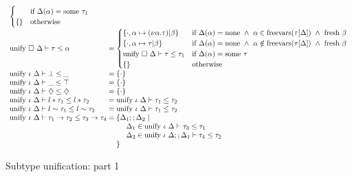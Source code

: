 \documentclass[sigplan,screen]{acmart}
\begin{document}
\begin{figure*}[h]
\[\begin{array}{l @{} l}
\begin{cases}
        &\text{if }
        \Delta(\alpha) = \text{some } \tau_1
        \\
        \{\}
        &\text{otherwise}
      \end{cases}
      \\
      \text{unify } \square\ \Delta \vdash \tau \leq \alpha	
      &{} =
      \begin{cases}  
        \{ \cdot,\alpha \mapsto (\nu\alpha.\tau)|\beta \}
        & \text{if } 
        \Delta(\alpha) = \text{none} \ \wedge\ 
        \alpha \in \text{freevars}(\tau[\Delta]) \ \wedge\ 
        \text{fresh } \beta
        \\
        \{ \cdot,\alpha \mapsto \tau|\beta \}
        & \text{if } 
        \Delta(\alpha) = \text{none} \ \wedge\ 
        \alpha \notin \text{freevars}(\tau[\Delta]) \ \wedge\ 
        \text{fresh } \beta
        \\
        \text{unify } \square\ \Delta \vdash \tau \leq \tau_1
        &\text{if }
        \Delta(\alpha) = \text{some } \tau
        \\
        \{\}
        &\text{otherwise}
      \end{cases}
      \\
      \text{unify } \iota\ \Delta \vdash \bot \leq \_	
      &{} = 
      \{\cdot\}
      \\
      \text{unify } \iota\ \Delta \vdash \_ \leq \top	
      &{} = 
      \{\cdot\}
      \\
      \text{unify } \iota\ \Delta \vdash \diamondsuit \leq \diamondsuit	
      &{} = 
      \{\cdot\}
      \\
      \text{unify } \iota\ \Delta \vdash l*\tau_1 \leq l*\tau_2	
      &{} = 
      \text{unify } \iota\ \Delta \vdash \tau_1 \leq \tau_2
      \\
      \text{unify } \iota\ \Delta \vdash l\sim\tau_1 \leq l\sim\tau_2	
      &{} = 
      \text{unify } \iota\ \Delta \vdash \tau_1 \leq \tau_2
      \\
      \text{unify } \iota\ \Delta \vdash \tau_1\rightarrow\tau_2 \leq \tau_3\rightarrow\tau_4	
      &{} = 
      \begin{array}[t]{@{} l}
        \{\Delta_1;;\Delta_2\ |
        \\ 
        \ \ \ \ \Delta_1 \in \text{unify } \iota\ \Delta \vdash \tau_3 \leq \tau_1
        \\
        \ \ \ \ \Delta_2 \in \text{unify } \iota\ \Delta;;\Delta_1 \vdash \tau_4 \leq \tau_2
        \\
        \}
      \end{array}

    \end{array}
  \]
  \caption{Subtype unification: part 1}
\end{figure*}
\end{document}
